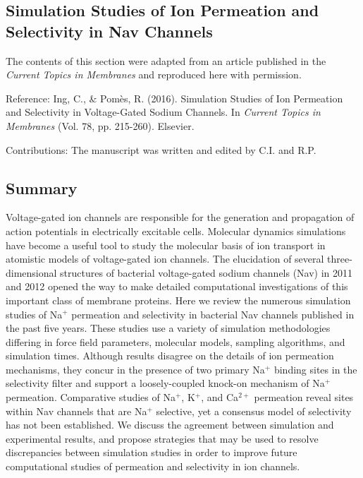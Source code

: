  \begin{refsection}
 \chapter{Simulation Studies of Ion Permeation and Selectivity in Nav Channels}
 
The contents of this section were adapted from an article published in the \textit{Current Topics in Membranes} and reproduced here with permission.\par
\bigskip
Reference: Ing, C., \& Pom\`es, R. (2016). Simulation Studies of Ion Permeation and Selectivity in Voltage-Gated Sodium Channels. In \textit{Current Topics in Membranes} (Vol. 78, pp. 215-260). Elsevier.\par
\bigskip
Contributions: The manuscript was written and edited by C.I. and R.P.

\newpage
 
 \section{Summary}
 
 Voltage-gated ion channels are responsible for the generation and propagation of action potentials in electrically excitable cells.  Molecular dynamics simulations have become a useful tool to study the molecular basis of ion transport in atomistic models of voltage-gated ion channels.  The elucidation of several three-dimensional structures of bacterial voltage-gated sodium channels (Nav) in 2011 and 2012 opened the way to make detailed computational investigations of this important class of membrane proteins.  Here we review the numerous simulation studies of Na$^{+}$ permeation and selectivity in bacterial Nav channels published in the past five years.  These studies use a variety of simulation methodologies differing in force field parameters, molecular models, sampling algorithms, and simulation times.  Although results disagree on the details of ion permeation mechanisms, they concur in the presence of two primary Na$^{+}$ binding sites in the selectivity filter and support a loosely-coupled knock-on mechanism of Na$^{+}$ permeation.  Comparative studies of Na$^{+}$, K$^{+}$, and Ca$^{2+}$ permeation reveal sites within Nav channels that are Na$^{+}$ selective, yet a consensus model of selectivity has not been established.  We discuss the agreement between simulation and experimental results, and propose strategies that may be used to resolve discrepancies between simulation studies in order to improve future computational studies of permeation and selectivity in ion channels.
 

\end{refsection}
